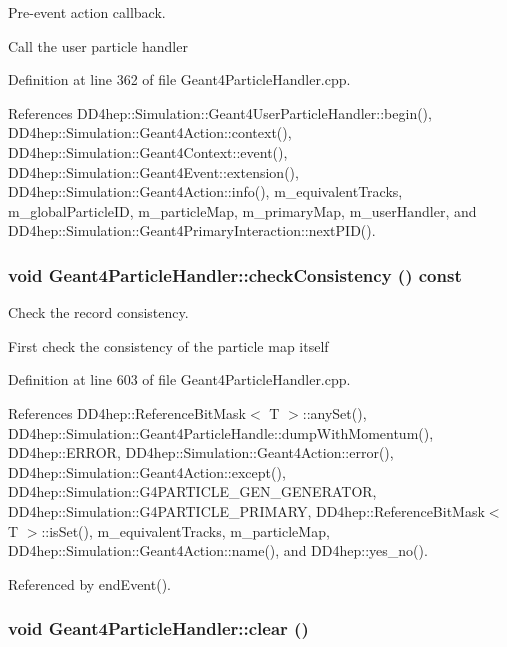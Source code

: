 Pre-\/event action callback. 

Call the user particle handler 

Definition at line 362 of file Geant4ParticleHandler.cpp.

References DD4hep::Simulation::Geant4UserParticleHandler::begin(), DD4hep::Simulation::Geant4Action::context(), DD4hep::Simulation::Geant4Context::event(), DD4hep::Simulation::Geant4Event::extension(), DD4hep::Simulation::Geant4Action::info(), m\_\-equivalentTracks, m\_\-globalParticleID, m\_\-particleMap, m\_\-primaryMap, m\_\-userHandler, and DD4hep::Simulation::Geant4PrimaryInteraction::nextPID().\hypertarget{class_d_d4hep_1_1_simulation_1_1_geant4_particle_handler_ae3ea53c5a352ce4a18785a7e34a5ce53}{
\subsubsection[{checkConsistency}]{\setlength{\rightskip}{0pt plus 5cm}void Geant4ParticleHandler::checkConsistency () const}}
\label{class_d_d4hep_1_1_simulation_1_1_geant4_particle_handler_ae3ea53c5a352ce4a18785a7e34a5ce53}


Check the record consistency. 

First check the consistency of the particle map itself 

Definition at line 603 of file Geant4ParticleHandler.cpp.

References DD4hep::ReferenceBitMask$<$ T $>$::anySet(), DD4hep::Simulation::Geant4ParticleHandle::dumpWithMomentum(), DD4hep::ERROR, DD4hep::Simulation::Geant4Action::error(), DD4hep::Simulation::Geant4Action::except(), DD4hep::Simulation::G4PARTICLE\_\-GEN\_\-GENERATOR, DD4hep::Simulation::G4PARTICLE\_\-PRIMARY, DD4hep::ReferenceBitMask$<$ T $>$::isSet(), m\_\-equivalentTracks, m\_\-particleMap, DD4hep::Simulation::Geant4Action::name(), and DD4hep::yes\_\-no().

Referenced by endEvent().\hypertarget{class_d_d4hep_1_1_simulation_1_1_geant4_particle_handler_a3d3d90e1e70f18337199c27da300c75d}{
\subsubsection[{clear}]{\setlength{\rightskip}{0pt plus 5cm}void Geant4ParticleHandler::clear ()}}
\label{class_d_d4hep_1_1_simulation_1_1_geant4_particle_handler_a3d3d90e1e70f18337199c27da300c75d}


